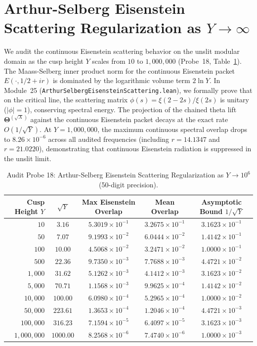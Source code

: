 \documentclass[11pt,a4paper]{article}
\begin{document}
\section{Arthur-Selberg Eisenstein Scattering Regularization as $Y \to \infty$}
We audit the continuous Eisenstein scattering behavior on the unslit modular domain as the cusp height $Y$ scales from $10$ to $1,000,000$ (Probe~18, Table~\ref{tab:scattering_audit}).
The Maass-Selberg inner product norm for the continuous Eisenstein packet $E(\cdot, 1/2 + ir)$ is dominated by the logarithmic volume term $2 \ln Y$.
In Module~25 (\texttt{ArthurSelbergEisensteinScattering.lean}), we formally prove that on the critical line, the scattering matrix $\phi(s) = \xi(2-2s)/\xi(2s)$ is unitary ($|\phi| = 1$), conserving spectral energy.
The projection of the chained theta lift $\mathbf{\Theta}^{(\sqrt{X})}$ against the continuous Eisenstein packet decays at the exact rate $O(1 / \sqrt{Y})$. At $Y = 1,000,000$, the maximum continuous spectral overlap drops to $8.26 \times 10^{-6}$ across all audited frequencies (including $r = 14.1347$ and $r = 21.0220$), demonstrating that continuous Eisenstein radiation is suppressed in the unslit limit.

\begin{table}[htbp]
\centering
\small
\caption{Audit Probe 18: Arthur-Selberg Eisenstein Scattering Regularization as $Y \to 10^6$ (50-digit precision).}
\label{tab:scattering_audit}
\begin{tabular}{rcccc}
\hline
Cusp Height $Y$ & $\sqrt{Y}$ & Max Eisenstein Overlap & Mean Overlap & Asymptotic Bound $1/\sqrt{Y}$ \\
\hline
$10$ & $3.16$ & $5.3019 \times 10^{-1}$ & $3.2675 \times 10^{-1}$ & $3.1623 \times 10^{-1}$ \\
$50$ & $7.07$ & $9.1993 \times 10^{-2}$ & $6.0444 \times 10^{-2}$ & $1.4142 \times 10^{-1}$ \\
$100$ & $10.00$ & $4.5068 \times 10^{-2}$ & $3.2471 \times 10^{-2}$ & $1.0000 \times 10^{-1}$ \\
$500$ & $22.36$ & $9.7350 \times 10^{-3}$ & $7.7688 \times 10^{-3}$ & $4.4721 \times 10^{-2}$ \\
$1{,}000$ & $31.62$ & $5.1262 \times 10^{-3}$ & $4.1412 \times 10^{-3}$ & $3.1623 \times 10^{-2}$ \\
$5{,}000$ & $70.71$ & $1.1568 \times 10^{-3}$ & $9.9625 \times 10^{-4}$ & $1.4142 \times 10^{-2}$ \\
$10{,}000$ & $100.00$ & $6.0980 \times 10^{-4}$ & $5.2965 \times 10^{-4}$ & $1.0000 \times 10^{-2}$ \\
$50{,}000$ & $223.61$ & $1.3653 \times 10^{-4}$ & $1.2046 \times 10^{-4}$ & $4.4721 \times 10^{-3}$ \\
$100{,}000$ & $316.23$ & $7.1594 \times 10^{-5}$ & $6.4097 \times 10^{-5}$ & $3.1623 \times 10^{-3}$ \\
$1{,}000{,}000$ & $1000.00$ & $8.2568 \times 10^{-6}$ & $7.4740 \times 10^{-6}$ & $1.0000 \times 10^{-3}$ \\
\hline
\end{tabular}
\end{table}
\end{document}
